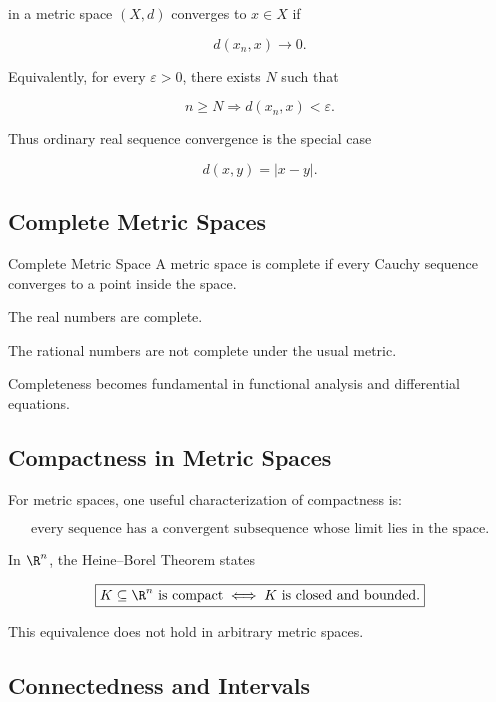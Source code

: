 in a metric space \((X,d)\) converges to \(x\in X\) if

\[
\boxed{
d(x_n,x)\to0.
}
\]

Equivalently, for every \(\varepsilon>0\), there exists \(N\) such that

\[
n\geq N
\Longrightarrow
d(x_n,x)<\varepsilon.
\]

Thus ordinary real sequence convergence is the special case

\[
d(x,y)=|x-y|.
\]

\subsection{Complete Metric Spaces}
\label{subsec:complete-metric-spaces}

\begin{definitionbox}{Complete Metric Space}
A metric space is complete if every Cauchy sequence converges to a point
inside the space.
\end{definitionbox}

The real numbers are complete.

The rational numbers are not complete under the usual metric.

Completeness becomes fundamental in functional analysis and differential
equations.

\subsection{Compactness in Metric Spaces}
\label{subsec:compactness-metric-analysis}

For metric spaces, one useful characterization of compactness is:

\[
\boxed{
\text{every sequence has a convergent subsequence
whose limit lies in the space}.
}
\]

In \(\R^n\), the Heine--Borel Theorem states

\[
\boxed{
K\subseteq\R^n
\text{ is compact}
\iff
K\text{ is closed and bounded}.
}
\]

This equivalence does not hold in arbitrary metric spaces.

\subsection{Connectedness and Intervals}
\label{subsec:connectedness-real-line}

